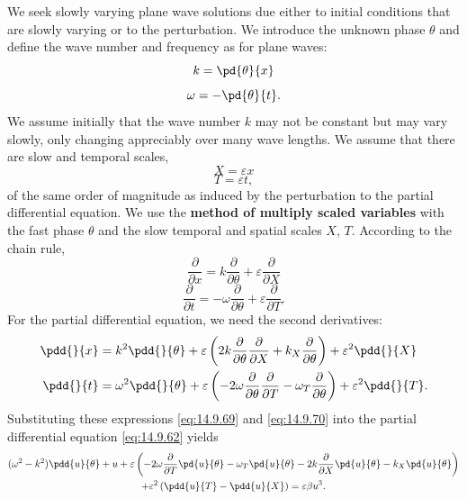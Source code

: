 We seek slowly varying plane wave solutions due either to initial conditions that are slowly varying or to the perturbation. We introduce the unknown phase $\theta$ and define the wave number and frequency as for plane waves:
\begin{equation}
k = \pd{\theta}{x}
\label{eq:14.9.63}
\end{equation}
\begin{equation}
\omega = -\pd{\theta}{t}.
\label{eq:14.9.64}
\end{equation}
We assume initially that the wave number $k$ may not be constant but may vary slowly, only changing appreciably over many wave lengths. We assume that there are slow and temporal scales,
\begin{equation}
\boxed{X = \varepsilon x}
\label{eq:14.9.65}
\end{equation}
\begin{equation}
\boxed{T = \varepsilon t,}
\label{eq:14.9.66}
\end{equation}
of the same order of magnitude as induced by the perturbation to the partial differential equation. We use the \textbf{method of multiply scaled variables} with the fast phase $\theta$ and the slow temporal and spatial scales $X$, $T$. According to the chain rule,
\begin{equation}
\frac{\partial}{\partial x} = k\frac{\partial}{\partial \theta} + \varepsilon\frac{\partial}{\partial X}
\label{eq:14.9.67b}
\end{equation}
\begin{equation}
\frac{\partial}{\partial t} = -\omega\frac{\partial}{\partial \theta} + \varepsilon\frac{\partial}{\partial T}.
\label{eq:14.9.68b}
\end{equation}
For the partial differential equation, we need the second derivatives:
\begin{align}
\pdd{}{x} &= k^2\pdd{}{\theta} + \varepsilon\left(2k\frac{\partial}{\partial \theta}\frac{\partial}{\partial X} + k_X\frac{\partial}{\partial \theta}\right) + \varepsilon^2\pdd{}{X} \label{eq:14.9.69} \\
\pdd{}{t} &= \omega^2\pdd{}{\theta} + \varepsilon\left(-2\omega\frac{\partial}{\partial \theta}\frac{\partial}{\partial T} - \omega_T\frac{\partial}{\partial \theta}\right) + \varepsilon^2\pdd{}{T}. \label{eq:14.9.70}
\end{align}
Substituting these expressions \eqref{eq:14.9.69} and \eqref{eq:14.9.70} into the partial differential equation \eqref{eq:14.9.62} yields
\begin{multline}
(\omega^2 - k^2)\pdd{u}{\theta} + u + \varepsilon\left(-2\omega\frac{\partial}{\partial T}\pd{u}{\theta} - \omega_T\pd{u}{\theta} - 2k\frac{\partial}{\partial X}\pd{u}{\theta} - k_X\pd{u}{\theta}\right) \\
+ \varepsilon^2\left(\pdd{u}{T} - \pdd{u}{X}\right) = \varepsilon\beta u^3. \label{eq:14.9.71}
\end{multline}

